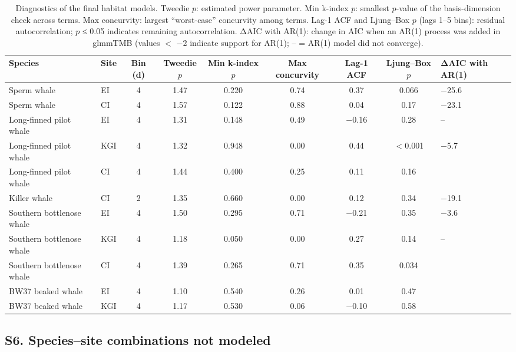 \documentclass[11pt]{article}
\begin{document}
\begin{table}[htbp]
\centering\footnotesize
\caption{Diagnostics of the final habitat models. Tweedie $p$: estimated power parameter. Min k-index $p$: smallest $p$-value of the basis-dimension check across terms. Max concurvity: largest ``worst-case'' concurvity among terms. Lag-1 ACF and Ljung--Box $p$ (lags 1--5 bins): residual autocorrelation; $p$ ≤ 0.05 indicates remaining autocorrelation. ΔAIC with AR(1): change in AIC when an AR(1) process was added in glmmTMB (values $<$ $-$2 indicate support for AR(1); -- = AR(1) model did not converge).}
\label{tab:diag}
\begin{tabular}{llcccccc>{\centering\arraybackslash}p{1.6cm}}
\toprule
Species & Site & Bin (d) & Tweedie $p$ & Min k-index $p$ & Max concurvity & Lag-1 ACF & Ljung--Box $p$ & ΔAIC with AR(1) \\
\midrule
Sperm whale & EI & 4 & 1.47 & 0.220 & 0.74 & 0.37 & 0.066 & $-$25.6 \\
Sperm whale & CI & 4 & 1.57 & 0.122 & 0.88 & 0.04 & 0.17 & $-$23.1 \\
Long-finned pilot whale & EI & 4 & 1.31 & 0.148 & 0.49 & $-$0.16 & 0.28 & -- \\
Long-finned pilot whale & KGI & 4 & 1.32 & 0.948 & 0.00 & 0.44 & $<$0.001 & $-$5.7 \\
Long-finned pilot whale & CI & 4 & 1.44 & 0.400 & 0.25 & 0.11 & 0.16 & 2.9 \\
Killer whale & CI & 2 & 1.35 & 0.660 & 0.00 & 0.12 & 0.34 & $-$19.1 \\
Southern bottlenose whale & EI & 4 & 1.50 & 0.295 & 0.71 & $-$0.21 & 0.35 & $-$3.6 \\
Southern bottlenose whale & KGI & 4 & 1.18 & 0.050 & 0.00 & 0.27 & 0.14 & -- \\
Southern bottlenose whale & CI & 4 & 1.39 & 0.265 & 0.71 & 0.35 & 0.034 & 3.2 \\
BW37 beaked whale & EI & 4 & 1.10 & 0.540 & 0.26 & 0.01 & 0.47 & 2.0 \\
BW37 beaked whale & KGI & 4 & 1.17 & 0.530 & 0.06 & $-$0.10 & 0.58 & 2.2 \\
\bottomrule
\end{tabular}
\end{table}

\subsection*{S6. Species--site combinations not modeled}
\end{document}
